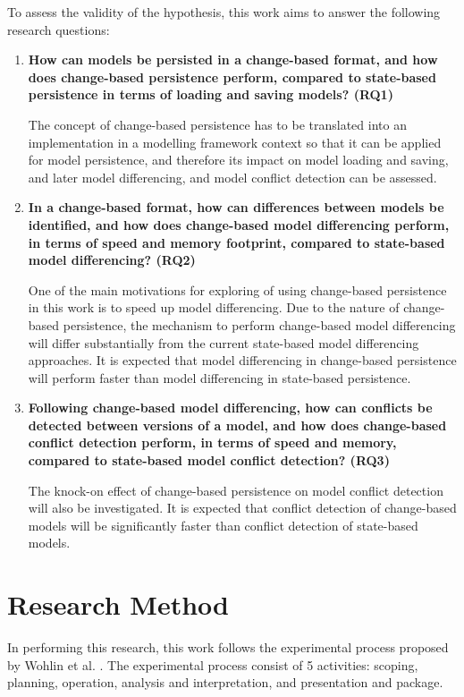 To assess the validity of the hypothesis, this work aims to answer the following research questions: 
\begin{enumerate} 
  \item \textbf{How can models be persisted in a change-based format, and how does change-based persistence perform, compared to state-based persistence in terms of loading and saving models? (RQ1)} 
  
  The concept of change-based persistence has to be translated into an implementation in a modelling framework context so that it can be applied for model persistence, and therefore its impact on model loading and saving, and later model differencing, and model conflict detection can be assessed.
  
  \item \textbf{In a change-based format, how can differences between models be identified, and how does change-based model differencing perform, in terms of speed and memory footprint, compared to state-based model differencing? (RQ2)} 
  
  One of the main motivations for exploring of using change-based persistence in this work is to speed up model differencing. Due to the nature of change-based persistence, the mechanism to perform change-based model differencing will differ substantially from the current state-based model differencing approaches. It is expected that model differencing in change-based persistence will perform faster than model differencing in state-based persistence.        
  
  \item \textbf{Following change-based model differencing, how can conflicts be detected between versions of a model, and  how does change-based conflict detection perform, in terms of speed and memory, compared to state-based model conflict detection? (RQ3)} 
  
  The knock-on effect of change-based persistence on model conflict detection will also be investigated. It is expected that conflict detection of change-based models will be significantly faster than conflict detection of state-based models.
\end{enumerate}

\section{Research Method}
\label{sec:research_method}
In performing this research, this work follows the experimental process proposed by Wohlin et al. \cite{DBLP:books/daglib/0029933/Wohlin}. The experimental process consist of 5 activities: scoping, planning, operation, analysis and interpretation, and presentation and package.

